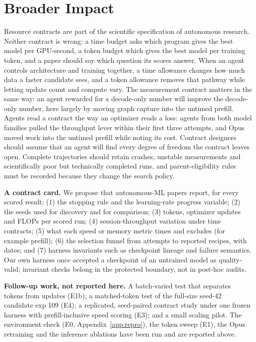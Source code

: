 \documentclass{article}
\begin{document}
\clearpage
\section{Broader Impact}\label{partthree}
Resource contracts are part of the scientific specification of autonomous research. Neither contract is wrong: a time budget asks which program gives the best model per GPU-second, a token budget which gives the best model per training token, and a paper should say which question its scores answer. When an agent controls architecture and training together, a time allowance changes how much data a faster candidate sees, and a token allowance removes that pathway while letting update count and compute vary. The measurement contract matters in the same way: an agent rewarded for a decode-only number will improve the decode-only number, here largely by moving graph capture into the untimed prefill. Agents read a contract the way an optimizer reads a loss: agents from both model families pulled the throughput lever within their first three attempts, and Opus moved work into the untimed prefill while noting its cost. Contract designers should assume that an agent will find every degree of freedom the contract leaves open. Complete trajectories should retain crashes, unstable measurements and scientifically poor but technically completed runs, and parent-eligibility rules must be recorded because they change the search policy.

\textbf{A contract card.} We propose that autonomous-ML papers report, for every scored result: (1) the stopping rule and the learning-rate progress variable; (2) the seeds used for discovery and for comparison; (3) tokens, optimizer updates and FLOPs per scored run; (4) session-throughput variation under time contracts; (5) what each speed or memory metric times and excludes (for example prefill); (6) the selection funnel from attempts to reported recipes, with dates; and (7) harness invariants such as checkpoint lineage and failure semantics. Our own harness once accepted a checkpoint of an untrained model as quality-valid; invariant checks belong in the protected boundary, not in post-hoc audits.

\textbf{Follow-up work, not reported here.} A batch-varied test that separates tokens from updates (E1b); a matched-token test of the full-size seed-42 candidate exp 109 (E4); a replicated, seed-paired contract study under one frozen harness with prefill-inclusive speed scoring (E3); and a small scaling pilot. The environment check (E0, Appendix~\ref{app:repro}), the token sweep (E1), the Opus retraining and the inference ablations have been run and are reported above.
\end{document}
